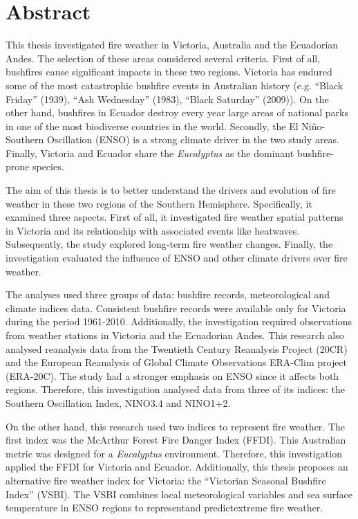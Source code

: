 
\chapter*{Abstract}

This thesis investigated fire weather in Victoria, Australia and the
Ecuadorian Andes. The selection of these areas considered several
criteria. First of all, bushfires cause significant impacts in these
two regions. Victoria has endured some of the most catastrophic bushfire
events in Australian history (e.g. \textquotedblleft Black Friday\textquotedblright{}
(1939), \textquotedblleft Ash Wednesday\textquotedblright{} (1983),
\textquotedblleft Black Saturday\textquotedblright{} (2009)). On the
other hand, bushfires in Ecuador destroy every year large areas of
national parks in one of the most biodiverse countries in the world.
Secondly, the El Ni\~no-Southern Oscillation (ENSO) is a strong climate
driver in the two study areas. Finally, Victoria and Ecuador share
the \textit{Eucalyptus} as the dominant bushfire-prone species. 

The aim of this thesis is to better understand the drivers and evolution
of fire weather in these two regions of the Southern Hemisphere. Specifically,
it examined three aspects. First of all, it investigated fire weather
spatial patterns in Victoria and its relationship with associated
events like heatwaves. Subsequently, the study explored long-term
fire weather changes. Finally, the investigation evaluated the influence
of ENSO and other climate drivers over fire weather.

The analyses used three groups of data: bushfire records, meteorological
and climate indices data. Consistent bushfire records were available
only for Victoria during the period 1961-2010. Additionally, the investigation
required observations from weather stations in Victoria and the Ecuadorian
Andes. This research also analysed reanalysis data from the Twentieth
Century Reanalysis Project (20CR) and the European Reanalysis of Global
Climate Observations ERA-Clim project (ERA-20C). The study had a stronger
emphasis on ENSO since it affects both regions. Therefore, this investigation
analysed data from three of its indices: the Southern Oscillation
Index, NINO3.4 and NINO1+2. 

On the other hand, this research used two indices to represent fire
weather. The first index was the McArthur Forest Fire Danger Index
(FFDI). This Australian metric was designed for a \textit{Eucalyptus}
environment. Therefore, this investigation applied the FFDI for Victoria
and Ecuador. Additionally, this thesis proposes an alternative fire
weather index for Victoria: the ``Victorian Seasonal Bushfire Index''
(VSBI). The VSBI combines local meteorological variables and sea surface
temperature in ENSO regions to represent\textemdash and predict\textemdash extreme
fire weather. 

